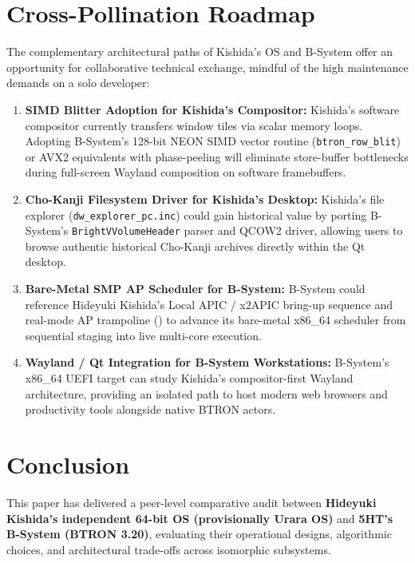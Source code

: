 \documentclass[10pt,journal,compsoc,twocolumn]{article}
\begin{document}
\section{Cross-Pollination Roadmap}
\label{sec:roadmap}

The complementary architectural paths of Kishida's OS and B-System offer an opportunity for collaborative technical exchange, mindful of the high maintenance demands on a solo developer:

\begin{enumerate}[leftmargin=*]
    \item \textbf{SIMD Blitter Adoption for Kishida's Compositor:} Kishida's software compositor currently transfers window tiles via scalar memory loops. Adopting B-System's 128-bit NEON SIMD vector routine (\texttt{btron\_row\_blit}) or AVX2 equivalents with phase-peeling will eliminate store-buffer bottlenecks during full-screen Wayland composition on software framebuffers.
    \item \textbf{Cho-Kanji Filesystem Driver for Kishida's Desktop:} Kishida's file explorer (\texttt{dw\_explorer\_pc.inc}) could gain historical value by porting B-System's \texttt{BrightVVolumeHeader} parser and QCOW2 driver, allowing users to browse authentic historical Cho-Kanji archives directly within the Qt desktop.
    \item \textbf{Bare-Metal SMP AP Scheduler for B-System:} B-System could reference Hideyuki Kishida's Local APIC / x2APIC bring-up sequence and real-mode AP trampoline () to advance its bare-metal x86\_64 scheduler from sequential staging into live multi-core execution.
    \item \textbf{Wayland / Qt Integration for B-System Workstations:} B-System's x86\_64 UEFI target can study Kishida's compositor-first Wayland architecture, providing an isolated path to host modern web browsers and productivity tools alongside native BTRON actors.
\end{enumerate}

\section{Conclusion}
\label{sec:conclusion}

This paper has delivered a peer-level comparative audit between \textbf{Hideyuki Kishida's independent 64-bit OS (provisionally Urara OS)} and \textbf{5HT's B-System (BTRON 3.20)}, evaluating their operational designs, algorithmic choices, and architectural trade-offs across isomorphic subsystems.
\end{document}
